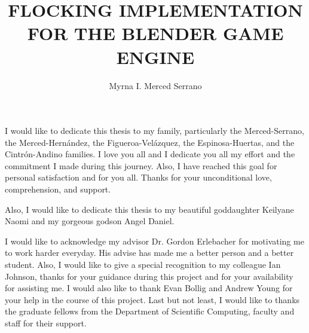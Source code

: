 \documentclass[11pt]{fsuthesis}
\title{FLOCKING IMPLEMENTATION FOR THE BLENDER GAME ENGINE}
\author{Myrna I. Merced Serrano}
\begin{document}
\frontmatter
\maketitle
\makesignaturepage

\begin{dedication}
I would like to dedicate this thesis to my family, particularly the Merced-Serrano, the Merced-Hern\'{a}ndez, the Figueroa-Vel\'{a}zquez, the Espinosa-Huertas, and the Cintr\'{o}n-Andino families. I love you all and I dedicate you all my effort and the commitment I made during this journey. Also, I have reached this goal for personal satisfaction and for you all. Thanks for your unconditional love, comprehension, and support. 

Also, I would like to dedicate this thesis to my beautiful goddaughter Keilyane Naomi and my gorgeous godson  Angel Daniel.

\end{dedication}

\begin{acknowledgments}
I would like to acknowledge my advisor Dr. Gordon Erlebacher for motivating me to work harder everyday. His advise has made me a better person and a better student. Also, I would like to give a special recognition to my colleague Ian Johnson, thanks for your guidance during this project and for your availability for assisting me. I would also like to thank Evan Bollig and Andrew Young for your help in the course of this project. Last but not least, I would like to thanks the graduate fellows from the Department of Scientific Computing, faculty and staff for their support.
\end{acknowledgments}

\tableofcontents
\listoftables
\listoffigures



\onehalfspacing
\end{document}
